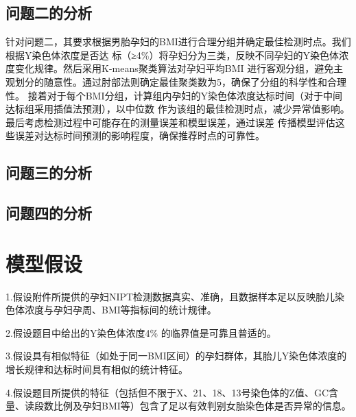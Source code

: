\documentclass{article}
\begin{document}
\subsection{\textbf{问题二的分析}}
针对问题二，其要求根据男胎孕妇的BMI进行合理分组并确定最佳检测时点。我们根据Y染色体浓度是否达
标（≥4\%）将孕妇分为三类，反映不同孕妇的Y染色体浓度变化规律。然后采用K-means聚类算法对孕妇平均BMI
进行客观分组，避免主观划分的随意性。通过肘部法则确定最佳聚类数为5，确保了分组的科学性和合理性。
接着对于每个BMI分组，计算组内孕妇的Y染色体浓度达标时间（对于中间达标组采用插值法预测），以中位数
作为该组的最佳检测时点，减少异常值影响。最后考虑检测过程中可能存在的测量误差和模型误差，通过误差
传播模型评估这些误差对达标时间预测的影响程度，确保推荐时点的可靠性。
\subsection{\textbf{问题三的分析}}

\subsection{\textbf{问题四的分析}}

\section{\textbf{模型假设}}
1.假设附件所提供的孕妇NIPT检测数据真实、准确，且数据样本足以反映胎儿染色体浓度与孕妇孕周、BMI等指标间的统计规律。

2.假设题目中给出的Y染色体浓度4\% 的临界值是可靠且普适的。

3.假设具有相似特征（如处于同一BMI区间）的孕妇群体，其胎儿Y染色体浓度的增长规律和达标时间具有相似的统计特征。

4.假设题目所提供的特征（包括但不限于X、21、18、13号染色体的Z值、GC含量、读段数比例及孕妇BMI等）包含了足以有效判别女胎染色体是否异常的信息。
\end{document}
